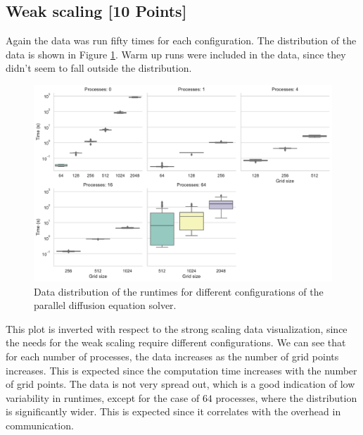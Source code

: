 \documentclass[unicode,11pt,a4paper,oneside,numbers=endperiod,openany]{scrartcl}
\begin{document}
\subsection{Weak scaling [10 Points]}
Again the data was run fifty times for each configuration. The distribution of
the data is shown in Figure \ref{fig:data_weak}. Warm up runs were included in
the data, since they didn't seem to fall outside the distribution.
\begin{figure}[h!]
    \centering
    \includegraphics[width=\textwidth]{../mini_app_mpi/data_var_weak.pdf}
    \caption{Data distribution of the runtimes for different configurations of
    the parallel diffusion equation solver.}
    \label{fig:data_weak}
\end{figure}
This plot is inverted with respect to the strong scaling data visualization,
since the needs for the weak scaling require different configurations.
We can see that for each number of processes, the data increases as the number
of grid points increases. This is expected since the computation time increases
with the number of grid points. The data is not very spread out, which is
a good indication of low variability in runtimes, except for the case of $64$
processes, where the distribution is significantly wider. This is expected since
it correlates with the overhead in communication.
\end{document}

